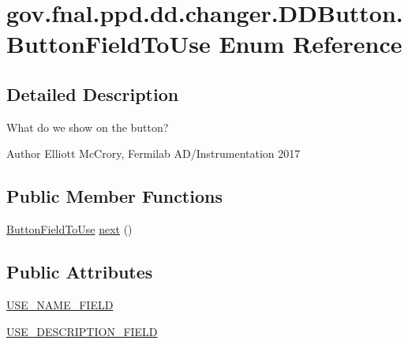 \hypertarget{enumgov_1_1fnal_1_1ppd_1_1dd_1_1changer_1_1DDButton_1_1ButtonFieldToUse}{\section{gov.\-fnal.\-ppd.\-dd.\-changer.\-D\-D\-Button.\-Button\-Field\-To\-Use Enum Reference}
\label{enumgov_1_1fnal_1_1ppd_1_1dd_1_1changer_1_1DDButton_1_1ButtonFieldToUse}
}


\subsection{Detailed Description}
What do we show on the button?

\begin{DoxyAuthor}{Author}
Elliott Mc\-Crory, Fermilab A\-D/\-Instrumentation 2017 
\end{DoxyAuthor}
\subsection*{Public Member Functions}
\begin{DoxyCompactItemize}
\item 
\hyperlink{enumgov_1_1fnal_1_1ppd_1_1dd_1_1changer_1_1DDButton_1_1ButtonFieldToUse}{Button\-Field\-To\-Use} \hyperlink{enumgov_1_1fnal_1_1ppd_1_1dd_1_1changer_1_1DDButton_1_1ButtonFieldToUse_af2ef4fcf39c333af8e9bc670a7c19840}{next} ()
\end{DoxyCompactItemize}
\subsection*{Public Attributes}
\begin{DoxyCompactItemize}
\item 
\hyperlink{enumgov_1_1fnal_1_1ppd_1_1dd_1_1changer_1_1DDButton_1_1ButtonFieldToUse_a68754ca17fd3e4649184763d72308b13}{U\-S\-E\-\_\-\-N\-A\-M\-E\-\_\-\-F\-I\-E\-L\-D}
\item 
\hyperlink{enumgov_1_1fnal_1_1ppd_1_1dd_1_1changer_1_1DDButton_1_1ButtonFieldToUse_a49d0f646fba74578ef1a73a09c0c943b}{U\-S\-E\-\_\-\-D\-E\-S\-C\-R\-I\-P\-T\-I\-O\-N\-\_\-\-F\-I\-E\-L\-D}
\end{DoxyCompactItemize}


